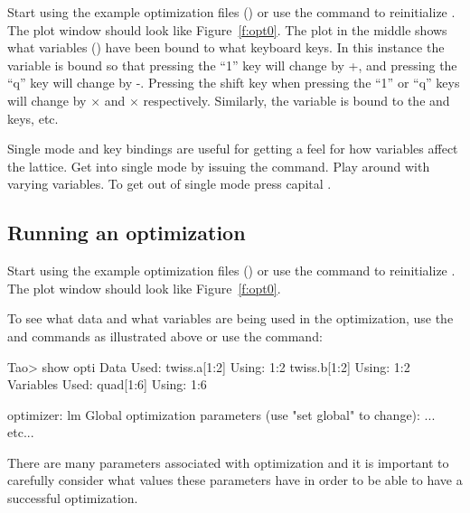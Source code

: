 \documentclass{hitec}     %
\begin{document}
{Start \tao using the example optimization files () or use the 
command to reinitialize \tao. The plot window should look like Figure~\ref{f:opt0}. The
 plot in the middle shows what variables () have been bound to what
keyboard keys. In this instance the  variable is bound so that pressing the ``1'' key
will change  by +, and pressing the ``q'' key will change  by
-.  Pressing the shift key when pressing the ``1'' or ``q'' keys will change 
by $\times$ and $\times$ respectively. Similarly, the 
variable is bound to the  and  keys, etc.

Single mode and key bindings are useful for getting a feel for how variables affect the lattice. Get
into single mode by issuing the  command. Play around with varying variables. To
get out of single mode press capital .

\newpage

\subsection{Running an optimization}
\label{s:opt.run}

Start \tao using the example optimization files () or use the 
command to reinitialize \tao. The plot window should look like Figure~\ref{f:opt0}. 

To see what data and what variables are being used in the optimization, use the  and
 commands as illustrated above or use the  command:
\begin{code}
Tao> show opti
Data Used:
  twiss.a[1:2]                                   Using: 1:2
  twiss.b[1:2]                                   Using: 1:2
Variables Used:
  quad[1:6]                                      Using: 1:6

optimizer:        lm
Global optimization parameters (use "set global" to change):
... etc...
\end{code}
There are many parameters associated with optimization and it is important to carefully consider
what values these parameters have in order to be able to have a successful optimization.

}
\end{document}
